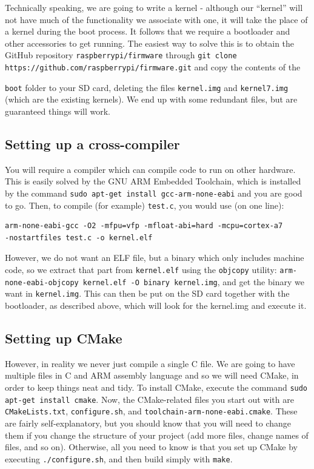 \documentclass[a4paper,11pt,reqno]{amsart}
\begin{document}
Technically speaking, we are going to write a kernel - although our ``kernel'' will not have much of the functionality we associate with one, it will take the place of a kernel during the boot process. It follows that we require a bootloader and other accessories to get running. The easiest way to solve this is to obtain the GitHub repository \texttt{raspberrypi/firmware} through \texttt{git clone https://github.com/raspberrypi/firmware.git} and copy the contents of the {\texttt{boot} folder to your SD card, deleting the files \texttt{kernel.img} and \texttt{kernel7.img} (which are the existing kernels). We end up with some redundant files, but are guaranteed things will work.

\subsection{Setting up a cross-compiler}
You will require a compiler which can compile code to run on other hardware. This is easily solved by the GNU ARM Embedded Toolchain, which is installed by the command \texttt{sudo apt-get install gcc-arm-none-eabi} and you are good to go. Then, to compile (for example) \texttt{test.c}, you would use (on one line):

\begin{verbatim}
arm-none-eabi-gcc -O2 -mfpu=vfp -mfloat-abi=hard -mcpu=cortex-a7 
-nostartfiles test.c -o kernel.elf
\end{verbatim}

However, we do not want an ELF file, but a binary which only includes machine code, so we extract that part from \texttt{kernel.elf} using the \texttt{objcopy} utility: \texttt{arm-none-eabi-objcopy kernel.elf -O binary kernel.img}, and get the binary we want in \texttt{kernel.img}. This can then be put on the SD card together with the bootloader, as described above, which will look for the kernel.img and execute it.

\subsection{Setting up CMake}
However, in reality we never just compile a single C file. We are going to have multiple files in C and ARM assembly language and so we will need CMake, in order to keep things neat and tidy. To install CMake, execute the command \texttt{sudo apt-get install cmake}. Now, the CMake-related files you start out with are \texttt{CMakeLists.txt}, \texttt{configure.sh}, and \texttt{toolchain-arm-none-eabi.cmake}. These are fairly self-explanatory, but you should know that you will need to change them if you change the structure of your project (add more files, change names of files, and so on). Otherwise, all you need to know is that you set up CMake by executing \texttt{./configure.sh}, and then build simply with \texttt{make}. 

}
\end{document}
